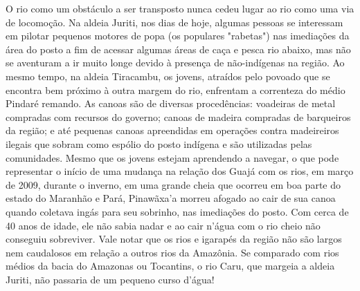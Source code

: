 O rio como um obstáculo a ser transposto nunca cedeu lugar ao rio como
uma via de locomoção. Na aldeia Juriti, nos dias de hoje, algumas
pessoas se interessam em pilotar pequenos motores de popa (os populares
"rabetas") nas imediações da área do posto a fim de acessar algumas
áreas de caça e pesca rio abaixo, mas não se aventuram a ir muito longe
devido à presença de não-indígenas na região. Ao mesmo tempo, na aldeia
Tiracambu, os jovens, atraídos pelo povoado que se encontra bem próximo
à outra margem do rio, enfrentam a correnteza do médio Pindaré remando.
As canoas são de diversas procedências: voadeiras de metal compradas com
recursos do governo; canoas de madeira compradas de barqueiros da
região; e até pequenas canoas apreendidas em operações contra
madeireiros ilegais que sobram como espólio do posto indígena e são
utilizadas pelas comunidades. Mesmo que os jovens estejam aprendendo a
navegar, o que pode representar o início de uma mudança na relação dos
Guajá com os rios, em março de 2009, durante o inverno, em uma grande
cheia que ocorreu em boa parte do estado do Maranhão e Pará, Pinawãxa'a
morreu afogado ao cair de sua canoa quando coletava ingás para seu
sobrinho, nas imediações do posto. Com cerca de 40 anos de idade, ele
não sabia nadar e ao cair n'água com o rio cheio não conseguiu
sobreviver. Vale notar que os rios e igarapés da região não são largos
nem caudalosos em relação a outros rios da Amazônia. Se comparado com
rios médios da bacia do Amazonas ou Tocantins, o rio Caru, que margeia a
aldeia Juriti, não passaria de um pequeno curso d'água!

